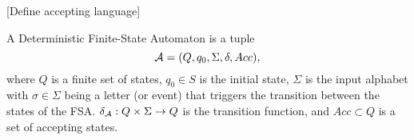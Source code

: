 \documentclass{ifacconf}
\newcommand{\red}[1]{{\color{red} #1}}
\begin{document}
% 

\red{[Define accepting language]}
\begin{definition}
A Deterministic Finite-State Automaton is a tuple
 \[\mathcal{A} = (Q, q_0, \Sigma, \delta, Acc),\] where %
$Q$ is a finite set of states, $q_0 \in S$ is the initial state,
$\Sigma$ is the input alphabet with $\sigma\in\Sigma$ being a letter (or event) that triggers the transition between the states of the FSA.   
$\delta_{\mathcal{A}} : Q \times \Sigma \rightarrow Q$ is the transition function, and
$Acc\subset Q$ is a set of accepting states.
\end{definition}
\end{document}

